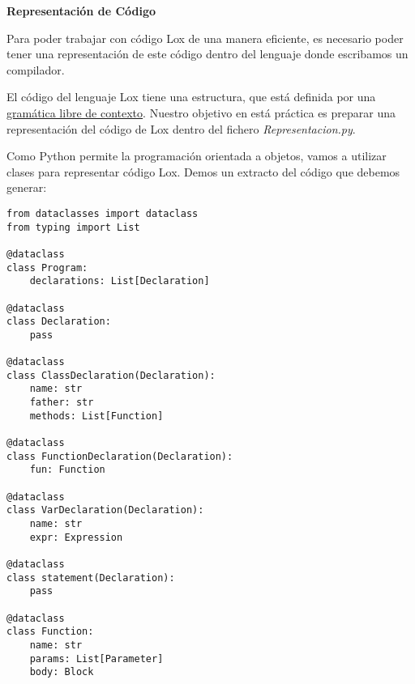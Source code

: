 
\author{Helmut Krauser}
\date{\today}
\title{}


\vspace{5mm}\centerline{\large\bf Representación de Código}\vspace{5mm}
\label{sec:orgc66f9a9}

Para poder trabajar con código Lox de una manera eficiente, es necesario poder 
tener una representación de este código dentro del lenguaje donde escribamos un compilador.

El código del lenguaje Lox tiene una estructura, que está definida por una \href{https://craftinginterpreters.com/appendix-i.html}{gramática libre de contexto}.
Nuestro objetivo en está práctica es preparar una representación del código de Lox dentro del fichero \emph{Representacion.py}.

Como Python permite la programación orientada a objetos, vamos a utilizar clases para representar código Lox.
Demos un extracto del código que debemos generar:
\begin{verbatim}
from dataclasses import dataclass
from typing import List 

@dataclass
class Program:
    declarations: List[Declaration]

@dataclass
class Declaration:
    pass

@dataclass
class ClassDeclaration(Declaration):
    name: str
    father: str
    methods: List[Function]

@dataclass
class FunctionDeclaration(Declaration):
    fun: Function

@dataclass
class VarDeclaration(Declaration):
    name: str
    expr: Expression

@dataclass
class statement(Declaration):
    pass

@dataclass
class Function:
    name: str
    params: List[Parameter]
    body: Block

\end{verbatim}

